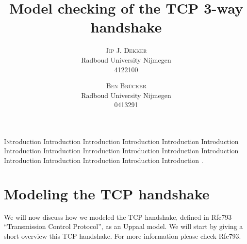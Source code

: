\documentclass[twocolumn]{article}
\title{\vspace{-15mm}%
	\fontsize{24pt}{10pt}\selectfont
	\textbf{Model checking of the TCP 3-way handshake}
	}
\author{%
	\large
	\textsc{Jip J. Dekker} \\[2mm]
	\normalsize	Radboud University Nijmegen \\
	\normalsize	4122100
	\vspace{-5mm}
	\and 
	\large
	\textsc{Ben Br\"ucker} \\[2mm]
	\normalsize	Radboud University Nijmegen \\
	\normalsize	0413291
	\vspace{-5mm}
	}
\date{}
\begin{document}

\thispagestyle{fancy}

\lettrine[nindent=0em,lines=3]{I} ntroduction Introduction Introduction Introduction Introduction Introduction Introduction Introduction Introduction Introduction Introduction Introduction Introduction Introduction Introduction Introduction Introduction .

\section{Modeling the TCP handshake}
We will now discuss how we modeled the TCP handshake, defined in Rfc793 ``Transmission Control Protocol'', as an Uppaal model. We will start by giving a short overview this TCP handshake. For more information please check Rfc793.
\end{document}

